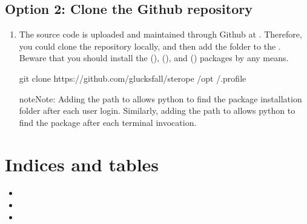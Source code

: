 \documentclass[letterpaper,10pt,english]{sphinxmanual}
\begin{document}
\section{Option 2: Clone the Github repository}
\label{\detokenize{Installation:option-2-clone-the-github-repository}}\begin{enumerate}
\def\theenumi{\arabic{enumi}}
\def\labelenumi{\theenumi .}
\makeatletter\def\p@enumii{\p@enumi \theenumi .}\makeatother
\item {} 

The source code is uploaded and maintained through Github at
. Therefore, you could clone the
repository locally, and then add the folder to the . Beware
that you should install the  (),  (), and
 () packages by any means.

\begin{sphinxVerbatim}[commandchars=\\\{\}]
git clone https://github.com/glucksfall/sterope /opt
   \PYGZgt{}\PYGZgt{} /.profile
\end{sphinxVerbatim}

\begin{sphinxadmonition}{note}{Note:}
Adding the path to  allows python to find the package
installation folder after each user login. Similarly, adding the path to
 allows python to find the package after each terminal
invocation.
\end{sphinxadmonition}

\end{enumerate}


\chapter{Indices and tables}
\label{\detokenize{index:indices-and-tables}}\begin{itemize}
\item {} 

\item {} 

\item {} 

\end{itemize}



\renewcommand{\indexname}{Index}
\printindex
\end{document}
